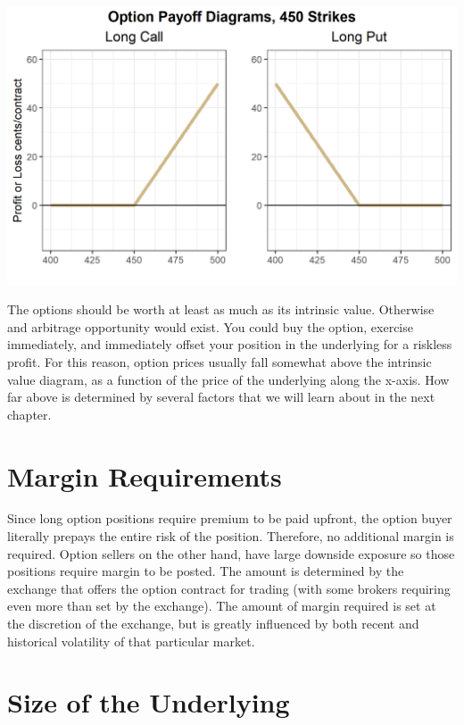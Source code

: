 \documentclass[
  letterpaper,
  DIV=11,
  numbers=noendperiod]{scrreprt}
\begin{document}
\includegraphics{assets/Options1-optionintrinsic.png}

The options should be worth at least as much as its intrinsic value.
Otherwise and arbitrage opportunity would exist. You could buy the
option, exercise immediately, and immediately offset your position in
the underlying for a riskless profit. For this reason, option prices
usually fall somewhat above the intrinsic value diagram, as a function
of the price of the underlying along the x-axis. How far above is
determined by several factors that we will learn about in the next
chapter.

\hypertarget{margin-requirements}{%
\section{Margin Requirements}\label{margin-requirements}}

Since long option positions require premium to be paid upfront, the
option buyer literally prepays the entire risk of the position.
Therefore, no additional margin is required. Option sellers on the other
hand, have large downside exposure so those positions require margin to
be posted. The amount is determined by the exchange that offers the
option contract for trading (with some brokers requiring even more than
set by the exchange). The amount of margin required is set at the
discretion of the exchange, but is greatly influenced by both recent and
historical volatility of that particular market.

\hypertarget{size-of-the-underlying}{%
\section{Size of the Underlying}\label{size-of-the-underlying}}
\end{document}
